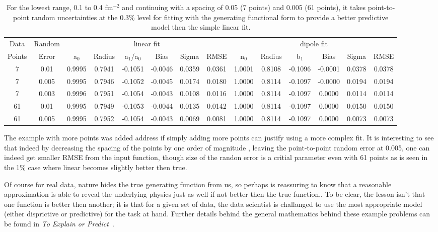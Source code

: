 \documentclass[10pt,aps,prc,twocolumn]{revtex4-1}
\begin{document}
\begin{table}
\caption{For the lowest range, 0.1 to 0.4 fm$^{-2}$ and continuing with a spacing of 0.05 (7 points) and 0.005 (61 points), 
it takes point-to-point random uncertainties at the 0.3\% level for fitting with the generating
functional form to provide a better predictive model then the simple linear fit.}
\begin{tabular}{cc|cccccc|cccccc} \hline
Data   & Random   & \multicolumn{6}{c|}{linear fit}                       & \multicolumn{6}{c}{dipole fit}            \\ 
Points & Error    & a$_0$ & Radius&a$_1$/a$_0$&  Bias  & Sigma &  RMSE  & n$_0$ & Radius& b$_1$  &  Bias  & Sigma &  RMSE   \\  \hline
7      & 0.01     & 0.9995& 0.7941& -0.1051& -0.0046& 0.0359& 0.0361 & 1.0001& 0.8108& -0.1096& -0.0001& 0.0378& 0.0378  \\ 
7      & 0.005    & 0.9995& 0.7946& -0.1052& -0.0045& 0.0174& 0.0180 & 1.0000& 0.8114& -0.1097& -0.0000& 0.0194& 0.0194  \\
7      & 0.003    & 0.9996& 0.7951& -0.1054& -0.0043& 0.0108& 0.0116 & 1.0000& 0.8114& -0.1097&  0.0000& 0.0114& 0.0114  \\
61     & 0.01     & 0.9995& 0.7949& -0.1053& -0.0044& 0.0135& 0.0142 & 1.0000& 0.8114& -0.1097&  0.0000& 0.0150& 0.0150  \\ 
61     & 0.005     & 0.9995& 0.7952& -0.1054& -0.0043& 0.0069& 0.0081 & 1.0000& 0.8114& -0.1097&  0.0000& 0.0073& 0.0073  \\ \hline
\end{tabular}
\label{simpleVSperfect}
\end{table}

The example with more points was added address if simply adding more points can justify using a more complex fit.
It is interesting to see that indeed by decreasing the spacing of the points
by one order of magnitude , leaving the point-to-point random error at 0.005, 
one can indeed get smaller RMSE from the input function, though size of the randon error is a critial parameter even
with 61 points as is seen in the 1\% case where linear becomes slightly better then true. 

Of course for real data, nature hides the true generating function from us, so perhaps is reassuring to know
that a reasonable approximation is able to reveal the underlying physics just as well if not better then the
true function..   
To be clear, the lesson isn't that one function is better then another; it is that for a given set of data,
the data scientist is challanged to use the most appropriate model (either disprictive or predictive) for
the task at hand.   Further details behind the general mathematics behind these example problems can be 
found in {\it{To Explain or Predict}}~\cite{Shmueli:2010}.    
\end{document}
